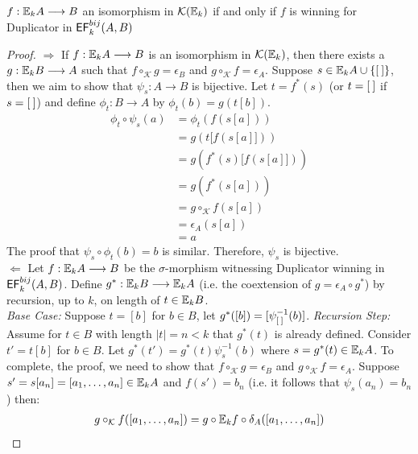 \begin{prop}
$f:{\mathbb{E}_{k}A} \longrightarrow B$ an isomorphism in $\mathcal{K}({\mathbb{E}_{k}})$ if and only if $f$ is winning for Duplicator in ${\mathsf{EF}^{bij}_{k}(A,B)}$  
\begin{proof}
$\Rightarrow$ If $f:{\mathbb{E}_{k}A} \longrightarrow B$ is an isomorphism in $\mathcal{K}({\mathbb{E}_{k}})$, then there exists a $g:{\mathbb{E}_{k}B} \longrightarrow A$ such that $f \circ_{\mathcal{K}} g = \epsilon_{B}$ and $g \circ_{\mathcal{K}} f = \epsilon_{A}$. Suppose $s \in {\mathbb{E}_{k}A} \cup \{{[\:]}\}$, then we aim to show that $\psi_{s}:A \longrightarrow B$ is bijective. Let $t = f^{*}(s)$ (or $t = {[\:]}$ if $s = {[\:]}$) and define $\phi_{t}:B \longrightarrow A$ by $\phi_{t}(b) = g(t[b])$.   
\begin{align*}
\phi_{t} \circ \psi_{s}(a) &= \phi_{t}(f(s[a])) \\
&= g(t[f(s[a]])) \\
&= g(f^{*}(s)[f(s[a]])) \\
&= g(f^{*}(s[a])) \\
&= g \circ_{\mathcal{K}} f(s[a]) \\
&= \epsilon_{A}(s[a]) \\
&= a 
\end{align*}
The proof that $\psi_{s} \circ \phi_{t}(b) = b$ is similar. Therefore, $\psi_{s}$ is bijective. \\
$\Leftarrow$ Let $f:{\mathbb{E}_{k}A} \longrightarrow B$ be the $\sigma$-morphism witnessing Duplicator winning in ${\mathsf{EF}^{bij}_{k}(A,B)}$. Define $g^{*}:{\mathbb{E}_{k}B} \longrightarrow {\mathbb{E}_{k}A}$ (i.e. the coextension of $g = \epsilon_{A} \circ g^{*}$) by recursion, up to $k$, on length of $t \in {\mathbb{E}_{k}B}$. \\   
\textit{Base Case:} Suppose $t = [b]$ for $b \in B$, let $g^{*}([b]) = [\psi_{{[\:]}}^{-1}(b)]$.
\textit{Recursion Step:} Assume for $t \in B$ with length $|t| = n < k$ that $g^{*}(t)$ is already defined. Consider $t' = t[b]$ for $b \in B$. Let $g^{*}(t') = g^{*}(t)\psi_{s}^{-1}(b)$ where $s = g^{*}(t) \in {\mathbb{E}_{k}A}$. To complete, the proof, we need to show that $f \circ_{\mathcal{K}} g = \epsilon_{B}$ and $g \circ_{\mathcal{K}} f = \epsilon_{A}$. Suppose $s' = s[a_{n}] = [a_{1},\dots,a_{n}] \in {\mathbb{E}_{k}A}$ and $f(s') = b_{n}$ (i.e. it follows that $\psi_{s}(a_{n}) = b_{n}$) then: 
\begin{align*}
g \circ_{\mathcal{K}} f([a_{1},\dots,a_{n}]) &= g \circ \efcomonad{k}{f} \circ \delta_{A}([a_{1},\dots,a_{n}]) \\ 

\end{align*}
\end{proof}
\end{prop}
